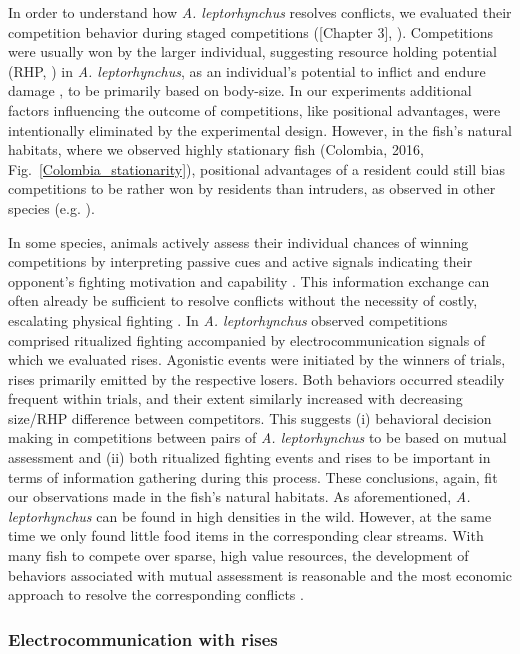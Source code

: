 \documentclass[11pt,pdftex]{article}
\newcommand{\fref}[1]{\textup{\ref{#1}}}
\newcommand{\fig}{Fig.}
\newcommand{\figref}[1]{\fig~\fref{#1}}
\newcommand{\note}[2][]{\textcolor{red!80!black}{[\textbf{\ifthenelse{\equal{#1}{}}{}{#1: }}#2]}}
\newcommand{\notetr}[1]{\note[TR]{#1}}
\newcommand{\lepto}{\textit{A. leptorhynchus}}
\begin{document}
In order to understand how \lepto{} resolves conflicts, we evaluated their competition behavior during staged competitions (\notetr{Chapter 3}, \citealp{Raab2021}). Competitions were usually won by the larger individual, suggesting resource holding potential (RHP, \citealp{Parker1974}) in \lepto{}, as an individual's potential to inflict and endure damage \citep{Archer1988}, to be primarily based on body-size. In our experiments additional factors influencing the outcome of competitions, like positional advantages, were intentionally eliminated by the experimental design. However, in the fish's natural habitats, where we observed highly stationary fish (Colombia, 2016, \figref{Colombia_stationarity}), positional advantages of a resident could still bias competitions to be rather won by residents than intruders, as observed in other species (e.g. \citealp{Alcock1997}). 

In some species, animals actively assess their individual chances of winning competitions by interpreting passive cues and active signals indicating their opponent's fighting motivation and capability \citep{Cluttonbrock1979, EnquistLeimar1987}. This information exchange can often already be sufficient to resolve conflicts without the necessity of costly, escalating physical fighting \citep{Parker1974, Cluttonbrock1979, Jason1990}. In \lepto{} observed competitions comprised ritualized fighting \citep{Triefenbach2008} accompanied by electrocommunication signals \citep{Smith2013} of which we evaluated rises. Agonistic events were initiated by the winners of trials, rises primarily emitted by the respective losers. Both behaviors occurred steadily frequent within trials, and their extent similarly increased with decreasing size/RHP difference between competitors. This suggests (i) behavioral decision making in competitions between pairs of \lepto{} to be based on mutual assessment and (ii) both ritualized fighting events and rises to be important in terms of information gathering during this process. These conclusions, again, fit our observations made in the fish's natural habitats. As aforementioned, \lepto{} can be found in high densities in the wild. However, at the same time we only found little food items in the corresponding clear streams. With many fish to compete over sparse, high value resources, the development of behaviors associated with mutual assessment is reasonable and the most economic approach to resolve the corresponding conflicts \citep{ArnottElwood2009}.

\subsubsection{Electrocommunication with rises}
\end{document}
